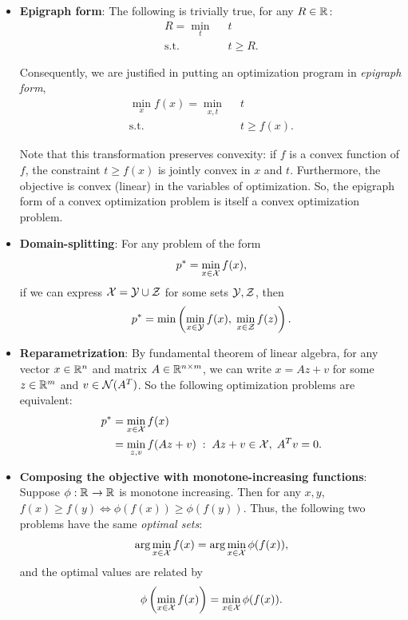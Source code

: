 \documentclass[12pt]{article}
\begin{document}
\begin{itemize}
\item \textbf{Epigraph form}: The following is trivially true, for any $R\in{ {\mathbb R}^{} }$:
%
\begin{align*}
R = \min_{t} \;\;& t \\
\text{s.t. } & t \geq R.
\end{align*}

Consequently, we are justified in putting an optimization program in \textit{epigraph form},
%
\begin{align*}
\min_x f(x) = \min_{x,t} \;\;& t \\
\text{s.t. } & t \geq f(x).
\end{align*}

Note that this transformation preserves convexity: if $f$ is a convex function of $f$, the constraint $t \geq f(x)$ is jointly convex in $x$ and $t$. Furthermore, the objective is convex (linear) in the variables of optimization. So, the epigraph form of a convex optimization problem is itself a convex optimization problem.

\item \textbf{Domain-splitting}: For any problem of the form
%
\begin{equation*}
p^* = \min_{x \in {\mathcal X}} f(x),
\end{equation*}
%
if we can express ${\mathcal X} = {\mathcal Y} \cup {\mathcal Z}$ for some sets ${\mathcal Y}, {\mathcal Z}$, then
%
\begin{equation*}
p^* = \min\left( \min_{x \in {\mathcal Y}} f(x), \; \min_{x \in {\mathcal Z}} f(z) \right).
\end{equation*}

\item \textbf{Reparametrization}: By fundamental theorem of linear algebra, for any vector $x \in { {\mathbb R}^{n} }$ and matrix $A \in { {\mathbb R}^{n \times m} }$, we can write $x = Az + v$ for some $z \in { {\mathbb R}^{m} }$ and $v \in {\mathcal N}(A^T)$. So the following optimization problems are equivalent:
%
\begin{align*}
p^* &= \min_{x \in {\mathcal X}} f(x) \\
&= \min_{z,v} f(Az + v) \; : \; Az + v \in {\mathcal X}, \; A^T v = 0.
\end{align*} 

\item \textbf{Composing the objective with monotone-increasing functions}: Suppose $\phi : { {\mathbb R}^{} } \to { {\mathbb R}^{} }$ is monotone increasing. Then for any $x,y$, $f(x) \geq f(y) \Longleftrightarrow \phi(f(x)) \geq \phi(f(y))$. Thus, the following two problems have the same \textit{optimal sets}:
%
\begin{equation*}
\arg \min_{x \in {\mathcal X}} f(x) = \arg \min_{x \in {\mathcal X}} \phi(f(x)),
\end{equation*}
%
and the optimal values are related by
%
\begin{equation*}
\phi\left( \min_{x \in {\mathcal X}} f(x) \right) = \min_{x \in {\mathcal X}} \phi(f(x)).
\end{equation*}

\end{itemize}
\end{document}
